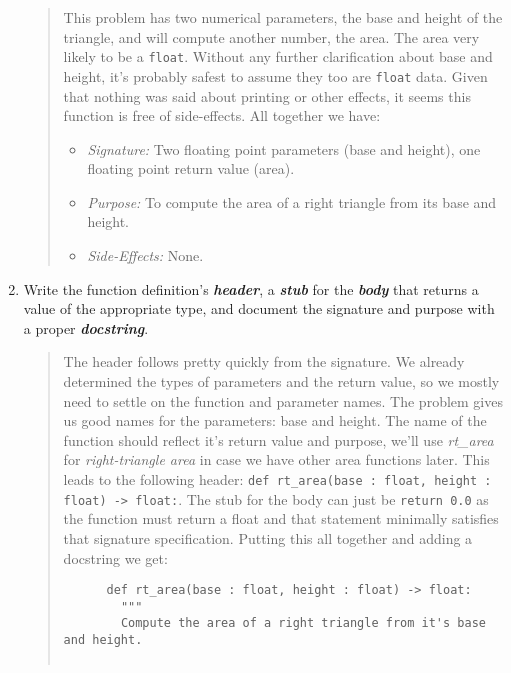 \documentclass[nobib]{tufte-handout}
\begin{document}
\begin{enumerate}
\begin{quote}
    This problem has two numerical parameters, the base and height of the triangle, and will compute another number, the area.  The area very likely to be a \texttt{float}. Without any further clarification about base and height, it's probably safest to assume they too are \texttt{float} data. Given that nothing was said about printing or other effects, it seems this function is free of side-effects. All together we have:
    \begin{itemize}
      \item \textit{Signature: } Two floating point parameters (base and height), one floating point return value (area). 
      \item \textit{Purpose: } To compute the area of a right triangle from its base and height. 
      \item \textit{Side-Effects: } None. 
    \end{itemize}
  \end{quote}
  \item Write the function definition's \textit{\textbf{header}}, a \textit{\textbf{stub}} for the \textit{\textbf{body}} that returns a value of the appropriate type, and document the signature and purpose with a proper \textit{\textbf{docstring}}.
  \begin{quote}
    The header follows pretty quickly from the signature. We already determined the types of parameters and the return value, so we mostly need to settle on the function and parameter names.  The problem gives us good names for the parameters: base and height. The name of the function should reflect it's return value and purpose, we'll use \textit{rt\_{}area} for \textit{right-triangle area} in case we have other area functions later. This leads to the following header: \texttt{def rt_area(base : float, height : float) -> float:}. The stub for the body can just be \texttt{return 0.0} as the function must return a float and that statement minimally satisfies that signature specification. Putting this all together and adding a docstring we get:
    \newpage 
    \begin{verbatim}
      def rt_area(base : float, height : float) -> float:
        """
        Compute the area of a right triangle from it's base and height. 


\end{verbatim}
\end{quote}
\end{enumerate}
\end{document}
